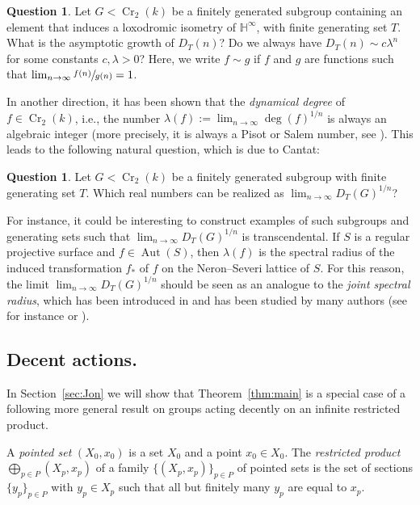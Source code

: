 \documentclass[11pt]{article}
\newcommand{\ie}{i.e.,\xspace}
\numberwithin{equation}{section}
\newcommand{\h}{\operatorname{\mathbb{H}^{\infty}}}
\newcommand{\Aut}{\operatorname{Aut}}
\newcommand{\Cr}{\operatorname{Cr}}
\theoremstyle{plain}
\theoremstyle{definition}
\newtheorem{question}[theorem]{Question}
\begin{document}
\begin{question}
Let $G<\Cr_2(k)$ be a finitely generated subgroup containing an element that induces a loxodromic isometry of $\h$, with finite generating set $T$. What is the asymptotic growth of $D_T(n)$? Do we always have $D_T(n)\sim c\lambda^n$ for some constants $c,\lambda>0$? Here, we write $f\sim g$ if $f$ and $g$ are functions such that $\lim_{n\to\infty} \sfrac{f(n)}{g(n)}=1$.

\end{question}

In another direction, it has been shown that the \emph{dynamical degree} of $f\in\Cr_2(k)$, \ie the number $\lambda(f):=\lim_{n\to\infty}\deg(f)^{1/n}$ is always an algebraic integer (more precisely, it is always a Pisot or Salem number, see \cite{blanc2016dynamical}). This leads to the following natural question, which is due to Cantat:

\begin{question}
Let $G<\Cr_2(k)$ be a finitely generated subgroup with finite generating set $T$. Which real numbers can be realized as $\lim_{n\to\infty}D_T(G)^{1/n}$?
\end{question}

For instance, it could be interesting to construct examples of such subgroups and generating sets such that $\lim_{n\to\infty}D_T(G)^{1/n}$ is transcendental. If $S$ is a {regular} projective surface and $f\in\Aut(S)$, then $\lambda(f)$ is the spectral radius of the induced transformation $f_*$ of $f$ on the Neron--Severi lattice of $S$. For this reason, the limit $\lim_{n\to\infty}D_T(G)^{1/n}$ should be seen as an analogue to the \emph{joint spectral radius}, which has been introduced in \cite{rota1960note} and has been studied by many authors (see for instance \cite{jungers2009joint} or \cite{breuillard2021joint}).

\subsection{Decent actions.}
In Section~\ref{sec:Jon} we will show that Theorem~\ref{thm:main} is a special case of a following more general result on groups acting decently on an infinite restricted product.

\label{sum}
A \emph{pointed set} $(X_0,x_0)$ is a set $X_0$ and a point $x_0\in X_0$. The \emph{restricted product} $\bigoplus_{p\in P} (X_p,x_p)$ of a family $\{(X_p,x_p)\}_{p\in P}$ of pointed sets is the set of sections $\{y_p\}_{p\in P}$ with $y_p\in X_p$ such that all but finitely many $y_p$ are equal to $x_p$.
\end{document}
